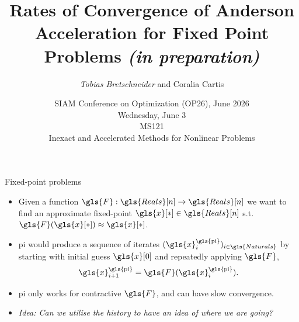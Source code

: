 \documentclass[aspectratio=169]{beamer}
\title[AA Convergence] %
{Rates of Convergence of Anderson Acceleration for 
 Fixed Point Problems \emph{(in preparation)}} %
\author{\emph{Tobias Bretschneider} and Coralia Cartis}
\institute{Mathematical Institute\\University of Oxford\\United Kingdom}
\date[Wed 4 June 2026]  %
{SIAM Conference on Optimization (OP26), June 2026 \\
Wednesday, June 3 \\ MS121 \\
Inexact and Accelerated Methods for Nonlinear Problems} %
\begin{document}
\begin{frame}[plain]
  \titlepage
\end{frame}

\begin{frame}{Fixed-point problems}
    \begin{itemize}
        \item Given a function $\gls{F} :\gls{Reals}[n] \to \gls{Reals}[n]$ we want to
            find an approximate fixed-point $\gls{x}[*]\in\gls{Reals}[n]$ s.t.
            $\gls{F}(\gls{x}[*]) \approx \gls{x}[*]$.
        \item \gls{pi} would produce a sequence of iterates
            $(\gls{x}_i^\text{\gls{pi}})_{i \in \gls{Naturals}}$ by starting with
            initial guess $\gls{x}[0]$ and repeatedly applying $\gls{F}$, 
            \begin{equation}
                \gls{x}_{i+1}^\text{\gls{pi}} = \gls{F}(\gls{x}_i^\text{\gls{pi}}).
            \end{equation}
        \item \gls{pi} only works for contractive $\gls{F}$, and can have slow
            convergence. 
        \item {\color{red}\emph{Idea: Can we utilise the history to have an idea of
            where we are going?}}
    \end{itemize}
\end{frame}
\end{document}

